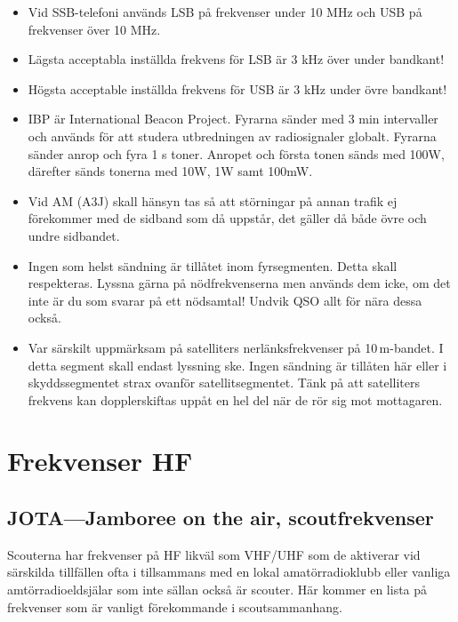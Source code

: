 \begin{itemize}
\item Vid SSB-telefoni används LSB på frekvenser under 10 MHz och USB på frekvenser över 10 MHz.
\item Lägsta acceptabla inställda frekvens för LSB är 3 kHz över under bandkant! 
\item Högsta acceptable inställda frekvens för USB är 3 kHz under övre bandkant!
\item IBP är International Beacon Project. Fyrarna sänder med 3 min intervaller och används för att studera utbredningen av radiosignaler globalt. Fyrarna sänder anrop och fyra 1 s toner. Anropet och första tonen sänds med 100W, därefter sänds tonerna med 10W, 1W samt 100mW.
\item Vid AM (A3J) skall hänsyn tas så att störningar på annan trafik ej fö\-re\-kom\-mer med de sidband som då uppstår, det gäller då både övre och undre sidbandet.
\item Ingen som helst sändning är tillåtet inom fyrsegmenten. Detta skall respekteras. Lyssna gärna på nödfrekvenserna men används dem icke, om det inte är du som svarar på ett nödsamtal! Undvik QSO allt för nära dessa också.
\item Var särskilt uppmärksam på satelliters nerlänksfrekvenser på 10\,m-bandet. I detta segment skall endast lyssning ske. Ingen sändning är tillåten här eller i skyddssegmentet strax ovanför satellitsegmentet. Tänk på att satelliters frekvens kan dopplerskiftas uppåt en hel del när de rör sig mot mottagaren.
\end{itemize}

\section{Frekvenser HF}

\subsection{JOTA---Jamboree on the air, scoutfrekvenser}

Scouterna har frekvenser på HF likväl som VHF/UHF som de aktiverar vid särskilda tillfällen ofta i tillsammans med en lokal amatörradioklubb eller vanliga amtörradioeldsjälar som inte sällan också är scouter. Här kommer en lista på frekvenser som är vanligt förekommande i scoutsammanhang.


